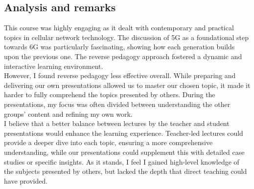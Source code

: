 \subsection{Analysis and remarks}
This course was highly engaging as it dealt with contemporary and practical topics in cellular network technology. The discussion of 5G as a foundational step towards 6G was particularly fascinating, showing how each generation builds upon the previous one. The reverse pedagogy approach fostered a dynamic and interactive learning environment.
\\
However, I found reverse pedagogy less effective overall. While preparing and delivering our own presentations allowed us to master our chosen topic, it made it harder to fully comprehend the topics presented by others. During the presentations, my focus was often divided between understanding the other groups' content and refining my own work.
\\
I believe that a better balance between lectures by the teacher and student presentations would enhance the learning experience. Teacher-led lectures could provide a deeper dive into each topic, ensuring a more comprehensive understanding, while our presentations could supplement this with detailed case studies or specific insights. As it stands, I feel I gained high-level knowledge of the subjects presented by others, but lacked the depth that direct teaching could have provided.